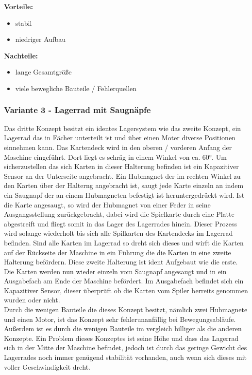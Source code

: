 \textbf{Vorteile:}
\begin{itemize}
    \item stabil
    \item niedriger Aufbau
\end{itemize}
\textbf{Nachteile:}
\begin{itemize}
    \item lange Gesamtgröße
    \item viele bewegliche Bauteile / Fehlerquellen
\end{itemize}

\subsubsection{Variante 3 - Lagerrad mit Saugnäpfe}

Das dritte Konzept besitzt ein identes Lagersystem wie das zweite Konzept, ein Lagerrad das in Fächer unterteilt ist und über einen Moter diverse Positionen einnehmen kann.
Das Kartendeck wird in den oberen / vorderen Anfang der Maschine eingeführt. Dort liegt es schräg in einem Winkel von ca. 60°. Um sicherzustellen das sich Karten in dieser Halterung befinden
ist ein Kapazitiver Sensor an der Unterseite angebracht. Ein Hubmagnet der im rechten Winkel zu den Karten über der Halterng angebracht ist, saugt jede Karte einzeln an indem ein Saugnapf der an einem Hubmagneten
befestigt ist heruntergedrückt wird. Ist die Karte angesaugt, so wird der Hubmagnet von einer Feder in seine Ausgangsstellung zurückgebracht, dabei wird die Spielkarte durch eine Platte abgestreift und fliegt somit in das Lager des
Lagerrades hinein. Dieser Prozess wird solange wiederholt bis sich alle Spilkarten des Kartendecks im Lagerrad befinden. Sind alle Karten im Lagerrad so dreht sich dieses und wirft die Karten auf der Rückseite der Maschine in ein Führung
die die Karten in eine zweite Halterung befördern. Diese zweite Halterung ist ident Aufgebaut wie die erste. Die Karten werden nun wieder einzeln vom Saugnapf angesaugt und in ein Ausgabefach am Ende der Maschine befördert. Im Ausgabefach befindet sich
ein Kapazitiver Sensor, dieser überprüft ob die Karten vom Spiler berreits genommen wurden oder nicht.\\

Durch die wenigen Bauteile die dieses Konzept besitzt, nämlich zwei Hubmagnete und einen Motor, ist das Konzept sehr fehlerunanfällig bei Bewegungsabläufe. Außerdem ist es
durch die wenigen Bauteile im vergleich billiger als die anderen Konzepte. Ein Problem dieses Konzeptes ist seine Höhe und dass das Lagerrad sich in der Mitte der Maschine befindet,
jedoch ist durch das geringe Gewicht des Lagerrades noch immer genügend stabilität vorhanden, auch wenn sich dieses mit voller Geschwindigkeit dreht. \\

